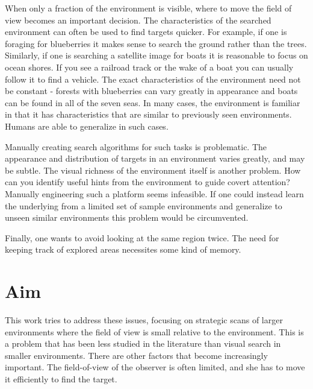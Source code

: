 When only a fraction of the environment is visible, where to move the field of view becomes an important decision.
The characteristics of the searched environment can often be used to find targets quicker.
For example, if one is foraging for blueberries it makes sense to search the ground rather than the trees.
Similarly, if one is searching a satellite image for boats it is reasonable to focus on ocean shores.
If you see a railroad track or the wake of a boat you can usually follow it to find a vehicle.
The exact characteristics of the environment need not be constant - forests with blueberries can vary greatly in appearance and boats can be found in all of the seven seas.
In many cases, the environment is familiar in that it has characteristics that are similar to previously seen environments.
Humans are able to generalize in such cases.

Manually creating search algorithms for such tasks is problematic.
The appearance and distribution of targets in an environment varies greatly, and may be subtle.
The visual richness of the environment itself is another problem.
How can you identify useful hints from the environment to guide covert attention?
Manually engineering such a platform seems infeasible.
If one could instead learn the underlying from a limited set of sample environments and generalize to unseen similar environments this problem would be circumvented.

Finally, one wants to avoid looking at the same region twice.
The need for keeping track of explored areas necessites some kind of memory.


\section{Aim}
\label{sec:aim}


This work tries to address these issues, focusing on strategic scans of larger environments where the field of view is small relative to the environment.
This is a problem that has been less studied in the literature than visual search in smaller environments.
There are other factors that become increasingly important. The field-of-view of the observer is often limited, and she has to move it efficiently to find the target.

